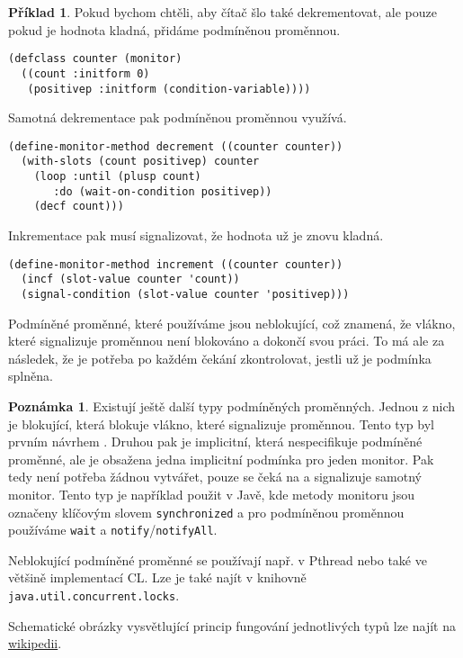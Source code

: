 \documentclass {article}
\theoremstyle {definition}
\newtheorem{example}{Příklad}
\newtheorem*{remark}{Poznámka}
\begin{document}
\begin {example}
  Pokud bychom chtěli, aby čítač šlo také dekrementovat, ale pouze
  pokud je hodnota kladná, přidáme podmíněnou proměnnou.

\begin{verbatim}
(defclass counter (monitor)
  ((count :initform 0)
   (positivep :initform (condition-variable))))
\end{verbatim}

Samotná dekrementace pak podmíněnou proměnnou využívá.

\begin{verbatim}
(define-monitor-method decrement ((counter counter))
  (with-slots (count positivep) counter
    (loop :until (plusp count)
       :do (wait-on-condition positivep))
    (decf count)))
\end{verbatim}

Inkrementace pak musí signalizovat, že hodnota už je znovu kladná.

\begin{verbatim}
(define-monitor-method increment ((counter counter))
  (incf (slot-value counter 'count))
  (signal-condition (slot-value counter 'positivep)))
\end{verbatim}
\end {example}

Podmíněné proměnné, které používáme jsou neblokující, což znamená, že
vlákno, které signalizuje proměnnou není blokováno a dokončí svou
práci. To má ale za následek, že je potřeba po každém čekání
zkontrolovat, jestli už je podmínka splněna.

\begin {remark}
  Existují ještě další typy podmíněných proměnných. Jednou z nich je
  blokující, která blokuje vlákno, které signalizuje proměnnou. Tento
  typ byl prvním návrhem \cite{hoare74,hansen72}. Druhou pak je
  implicitní, která nespecifikuje podmíněné proměnné, ale je obsažena
  jedna implicitní podmínka pro jeden monitor. Pak tedy není potřeba
  žádnou vytvářet, pouze se čeká na a signalizuje samotný
  monitor. Tento typ je například použit v Javě, kde metody monitoru
  jsou označeny klíčovým slovem \texttt {synchronized} a pro
  podmíněnou proměnnou používáme \texttt {wait} a
  \texttt{notify}/\texttt {notifyAll}.

  Neblokující podmíněné proměnné se používají např. v Pthread nebo
  také ve většině implementací CL. Lze je také najít v knihovně
  \texttt {java.util.concurrent.locks}.

  Schematické obrázky vysvětlující princip fungování jednotlivých typů
  lze najít na
  \href{https://en.wikipedia.org/wiki/Monitor_(synchronization)#Blocking_condition_variables}{wikipedii}.
\end {remark}
\end{document}
